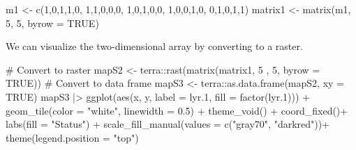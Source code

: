 \documentclass[
  letterpaper,
]{book}
\newenvironment{Shaded}{\begin{snugshade}}{\end{snugshade}}
\newcommand{\AttributeTok}[1]{\textcolor[rgb]{0.40,0.45,0.13}{#1}}
\newcommand{\CommentTok}[1]{\textcolor[rgb]{0.37,0.37,0.37}{#1}}
\newcommand{\ConstantTok}[1]{\textcolor[rgb]{0.56,0.35,0.01}{#1}}
\newcommand{\DecValTok}[1]{\textcolor[rgb]{0.68,0.00,0.00}{#1}}
\newcommand{\FloatTok}[1]{\textcolor[rgb]{0.68,0.00,0.00}{#1}}
\newcommand{\FunctionTok}[1]{\textcolor[rgb]{0.28,0.35,0.67}{#1}}
\newcommand{\NormalTok}[1]{\textcolor[rgb]{0.00,0.23,0.31}{#1}}
\newcommand{\OtherTok}[1]{\textcolor[rgb]{0.00,0.23,0.31}{#1}}
\newcommand{\SpecialCharTok}[1]{\textcolor[rgb]{0.37,0.37,0.37}{#1}}
\newcommand{\StringTok}[1]{\textcolor[rgb]{0.13,0.47,0.30}{#1}}
\begin{document}
\begin{Shaded}
\begin{Highlighting}[]
\NormalTok{m1 }\OtherTok{\textless{}{-}} \FunctionTok{c}\NormalTok{(}\DecValTok{1}\NormalTok{,}\DecValTok{0}\NormalTok{,}\DecValTok{1}\NormalTok{,}\DecValTok{1}\NormalTok{,}\DecValTok{0}\NormalTok{,}
       \DecValTok{1}\NormalTok{,}\DecValTok{1}\NormalTok{,}\DecValTok{0}\NormalTok{,}\DecValTok{0}\NormalTok{,}\DecValTok{0}\NormalTok{,}
       \DecValTok{1}\NormalTok{,}\DecValTok{0}\NormalTok{,}\DecValTok{1}\NormalTok{,}\DecValTok{0}\NormalTok{,}\DecValTok{0}\NormalTok{,}
       \DecValTok{1}\NormalTok{,}\DecValTok{0}\NormalTok{,}\DecValTok{0}\NormalTok{,}\DecValTok{1}\NormalTok{,}\DecValTok{0}\NormalTok{,}
       \DecValTok{0}\NormalTok{,}\DecValTok{1}\NormalTok{,}\DecValTok{0}\NormalTok{,}\DecValTok{1}\NormalTok{,}\DecValTok{1}\NormalTok{)}
\NormalTok{matrix1 }\OtherTok{\textless{}{-}} \FunctionTok{matrix}\NormalTok{(m1, }\DecValTok{5}\NormalTok{, }\DecValTok{5}\NormalTok{, }\AttributeTok{byrow =} \ConstantTok{TRUE}\NormalTok{)}
\end{Highlighting}
\end{Shaded}

We can visualize the two-dimensional array by converting to a raster.

\begin{Shaded}
\begin{Highlighting}[]
\CommentTok{\# Convert to raster }
\NormalTok{mapS2 }\OtherTok{\textless{}{-}}\NormalTok{ terra}\SpecialCharTok{::}\FunctionTok{rast}\NormalTok{(}\FunctionTok{matrix}\NormalTok{(matrix1, }\DecValTok{5}\NormalTok{ , }\DecValTok{5}\NormalTok{, }\AttributeTok{byrow =} \ConstantTok{TRUE}\NormalTok{))}
\CommentTok{\# Convert to data frame}
\NormalTok{mapS3 }\OtherTok{\textless{}{-}}\NormalTok{ terra}\SpecialCharTok{::}\FunctionTok{as.data.frame}\NormalTok{(mapS2, }\AttributeTok{xy =} \ConstantTok{TRUE}\NormalTok{)}
\NormalTok{mapS3 }\SpecialCharTok{|\textgreater{}}
  \FunctionTok{ggplot}\NormalTok{(}\FunctionTok{aes}\NormalTok{(x, y, }\AttributeTok{label =}\NormalTok{ lyr}\FloatTok{.1}\NormalTok{, }\AttributeTok{fill =} \FunctionTok{factor}\NormalTok{(lyr}\FloatTok{.1}\NormalTok{))) }\SpecialCharTok{+}
  \FunctionTok{geom\_tile}\NormalTok{(}\AttributeTok{color =} \StringTok{"white"}\NormalTok{, }\AttributeTok{linewidth =} \FloatTok{0.5}\NormalTok{) }\SpecialCharTok{+}
  \FunctionTok{theme\_void}\NormalTok{() }\SpecialCharTok{+}
  \FunctionTok{coord\_fixed}\NormalTok{()}\SpecialCharTok{+}
  \FunctionTok{labs}\NormalTok{(}\AttributeTok{fill =} \StringTok{"Status"}\NormalTok{) }\SpecialCharTok{+}
  \FunctionTok{scale\_fill\_manual}\NormalTok{(}\AttributeTok{values =} \FunctionTok{c}\NormalTok{(}\StringTok{"gray70"}\NormalTok{, }\StringTok{"darkred"}\NormalTok{))}\SpecialCharTok{+}
  \FunctionTok{theme}\NormalTok{(}\AttributeTok{legend.position =} \StringTok{"top"}\NormalTok{)}
\end{Highlighting}
\end{Shaded}
\end{document}
